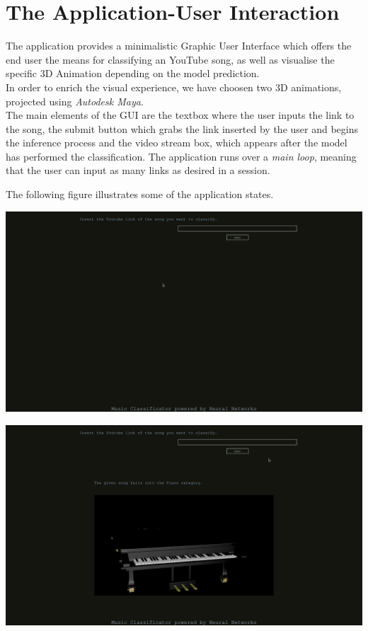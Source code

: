 \section{The Application-User Interaction}
	The application provides a minimalistic Graphic User Interface which offers the end user the means for
	classifying an YouTube song, as well as visualise the specific 3D Animation depending on the model prediction. \\
	In order to enrich the visual experience, we have choosen two 3D animations, projected using \textit{Autodesk Maya}.\\
	The main elements of the GUI are the textbox where the user inputs the link to the song, the submit
	button which grabs the link inserted by the user and begins the inference process and the video stream box,
	which appears after the model has performed the classification. The application runs over a \textit{main loop},
	meaning that the user can input as many links as desired in a session.


	The following figure illustrates some of the application states.


			\begin{center}
				\centering
				\includegraphics[width = 5.5in]{images/basic_interface.png}
				\centerline{}
			\label{guis}
			\end{center}

			\begin{center}
				\centering
				\includegraphics[width = 5.5in]{images/piano.png}
			\centerline{}
			\label{guip}
			\end{center}

